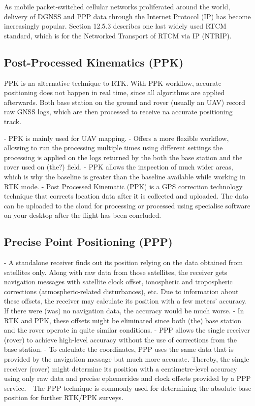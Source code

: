 As mobile packet-switched cellular networks proliferated around the world,
delivery of DGNSS and PPP data through the Internet Protocol (IP) has become increasingly popular. Section 12.5.3 describes one last widely used RTCM standard,
which is for the Networked Transport of RTCM via IP (NTRIP).

\subsection{Post-Processed Kinematics (PPK)}\label{sec:II_gnssAug_ppk}
PPK is na alternative technique to RTK. With PPK workflow, accurate positioning does not happen in real time, since all algorithms are applied afterwards. Both base station on the ground and rover (usually an UAV) record raw GNSS logs, which are then processed to receive na accurate positioning track.

- PPK is mainly used for UAV mapping.
- Offers a more flexible workflow, allowing to run the processing multiple times using different settings the processing is applied on the logs returned by the both the base station and the rover used on (the?) field.
- PPK allows the inspection of much wider areas, which is why the baseline is greater than the baseline available while working in RTK mode.
- Post Processed Kinematic (PPK) is a GPS correction technology technique that corrects location data after it is collected and uploaded. The data can be uploaded to the cloud for processing or processed using specialise software on your desktop after the flight has been concluded.

\subsection{Precise Point Positioning (PPP)}\label{sec:II_gnssAug_ppp}
- A standalone receiver finds out its position relying on the data obtained from satellites only. Along with raw data from those satellites, the receiver gets navigation messages with satellite clock offset, ionospheric and tropospheric corrections (atmospheric-related disturbances), etc. Due to information about these offsets, the receiver may calculate its position with a few meters' accuracy. If there were (was) no navigation data, the accuracy would be much worse.
- In RTK and PPK, these offsets might be eliminated since both (the) base station and the rover operate in quite similar conditions.
- PPP allows the single receiver (rover) to achieve high-level accuracy without the use of corrections from the base station.
- To calculate the coordinates, PPP uses the same data that is provided by the navigation message but much more accurate. Thereby, the single receiver (rover) might determine its position with a centimetre-level accuracy using only raw data and precise ephemerides and clock offsets provided by a PPP service.
- The PPP technique is commonly used for determining the absolute base position for further RTK/PPK surveys.

